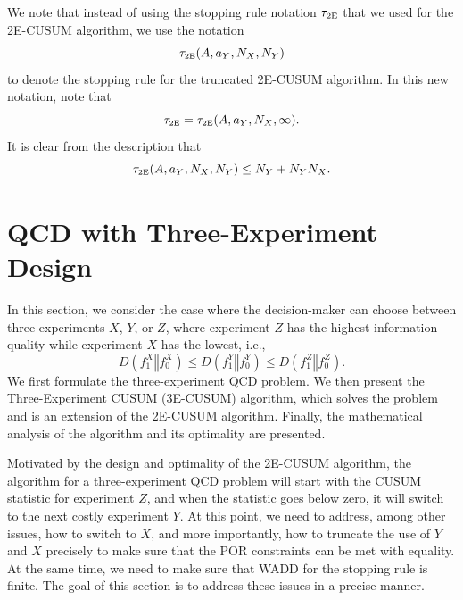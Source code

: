 \documentclass[journal, onecolumn]{IEEEtran}
\begin{document}
We note that instead of using the stopping rule notation $\tau_{\textup{\fontsize{6 pt}{10 pt}\selectfont 2E}}$ that we used for the 2E-CUSUM algorithm, we use the notation
$$
\tau_{\textup{\fontsize{6 pt}{10 pt}\selectfont 2E}}(A, a_Y, N_X, N_Y)
$$
to denote the stopping rule for the truncated 2E-CUSUM algorithm. In this new notation, note that
$$
\tau_{\textup{\fontsize{6 pt}{10 pt}\selectfont 2E}} = \tau_{\textup{\fontsize{6 pt}{10 pt}\selectfont 2E}}(A, a_Y, N_X, \infty). 
$$
It is clear from the description that 
$$ \tau_{\textup{\fontsize{6 pt}{10 pt}\selectfont 2E}}(A, a_Y, N_X, N_Y) \leq N_Y + N_Y N_X. $$






\vspace{1cm}
\section{QCD with Three-Experiment Design}
\label{sec:three-expt}

In this section, we consider the case where the decision-maker can choose between three experiments $X$, $Y$, or $Z$, where experiment $Z$ has the highest information quality while experiment $X$ has the lowest, i.e.,
\begin{equation}
D(f_1^X \mathrel{\Vert} f_0^X) \leq D(f_1^Y \mathrel{\Vert} f_0^Y) \leq D(f_1^Z \mathrel{\Vert} f_0^Z). 
\end{equation}
We first formulate the three-experiment QCD problem. We then present the Three-Experiment CUSUM (3E-CUSUM) algorithm, which solves the problem and is an extension of the 2E-CUSUM algorithm. Finally, the mathematical analysis of the algorithm and its optimality are presented.

Motivated by the design and optimality of the 2E-CUSUM algorithm, the algorithm for a three-experiment QCD problem will start with the CUSUM statistic for experiment $Z$, and when the statistic goes below zero, it will switch to the next costly experiment $Y$. At this point, we need to address, among other issues, how to switch to $X$, and more importantly, how to truncate the use of $Y$ and $X$ precisely to make sure that the POR constraints can be met with equality. At the same time, we need to make sure that WADD for the stopping rule is finite. The goal of this section is to address these issues in a precise manner.
\end{document}

